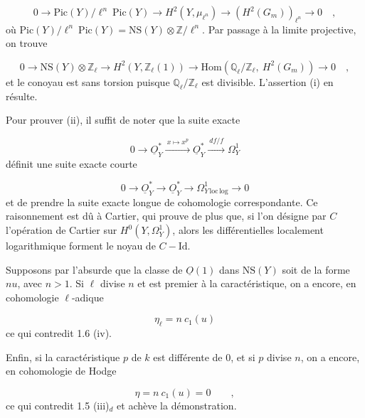 \begin{equation*}
0 \longrightarrow \mathrm{Pic}(Y)/\ell^n\ \mathrm{Pic}(Y) \longrightarrow H^2(Y,\mu_{\ell^n}) \longrightarrow (H^2(G_m))_{\ell^n} \longrightarrow 0 \quad ,
\end{equation*}
où $\mathrm{Pic}(Y)/\ell^n\ \mathrm{Pic}(Y) = \mathrm{NS}(Y) \otimes \mathbb{Z}/\ell^n$. Par passage à la limite projective, on trouve

\begin{equation*}
0 \longrightarrow \mathrm{NS}(Y) \otimes \mathbb{Z}_\ell \longrightarrow H^2(Y, \mathbb{Z}_\ell(1)) \longrightarrow \mathrm{Hom}(\mathbb{Q}_\ell / \mathbb{Z}_\ell,\ H^2(G_m)) \longrightarrow 0 \quad ,
\end{equation*}
et le conoyau est sans torsion puisque $\mathbb{Q}_\ell / \mathbb{Z}_\ell$ est divisible. L'assertion (i) en résulte.

Pour prouver (ii), il suffit de noter que la suite exacte

\begin{equation*}
0 \longrightarrow \underline{O}^*_Y \xrightarrow{\ x \longmapsto x^p\ } \underline{O}^*_Y \xrightarrow{\ df/f\ } \Omega^1_Y
\end{equation*}
définit une suite exacte courte

\begin{equation*}
0 \longrightarrow \underline{O}^*_Y \longrightarrow \underline{O}^*_Y \longrightarrow \Omega^1_{Y\,\mathrm{loc}\,\mathrm{log}} \longrightarrow 0
\end{equation*}
et de prendre la suite exacte longue de cohomologie correspondante. Ce raisonnement est dû à Cartier, qui prouve de plus que, si l'on désigne par $C$ l'opération de Cartier sur $H^0(Y,\Omega^1_Y)$, alors les différentielles localement logarithmique forment le noyau de $C - \mathrm{Id}$.

Supposons par l'absurde que la classe de $\underline{O}(1)$ dans $\mathrm{NS}(Y)$ soit de la forme $nu$, avec $n > 1$. Si $\ell$ divise $n$ et est premier à la caractéristique,
on a encore, en cohomologie $\ell$-adique

\begin{equation*}
\eta_\ell = n\ c_1(u)
\end{equation*}
ce qui contredit 1.6 (iv).

Enfin, si la caractéristique $p$ de $k$ est différente de $0$, et si $p$ divise $n$, on a encore, en cohomologie de Hodge

\begin{equation*}
\eta = n\ c_1(u) = 0 \qquad ,
\end{equation*}
ce qui contredit 1.5 (iii)$_d$ et achève la démonstration.


